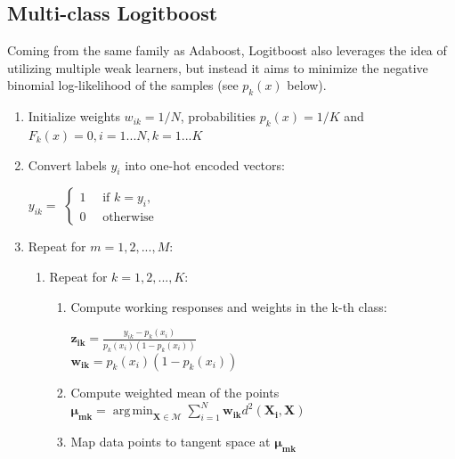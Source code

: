 \documentclass[12pt]{article}
\DeclareMathOperator*{\argmin}{arg\,min}
\begin{document}
\begin{sloppypar}
\subsection{Multi-class Logitboost}
Coming from the same family as Adaboost, Logitboost also leverages the idea of utilizing multiple weak learners, but instead it aims to minimize the negative binomial log-likelihood of the samples (see $p_{k}(x)$ below). \\

\begin{algorithm}[H]
    \begin{enumerate}
    \item Initialize weights $w_{ik} = 1/N$, probabilities $p_{k}(x) = 1/K$ and $F_{k}(x) = 0, i = 1...N, k = 1...K$\\
    \item Convert labels $y_{i}$ into one-hot encoded vectors:
        \begin{center}
            $y_{ik} = $
            $\begin{cases}
                1 \quad \text{ if } k = y_{i}, \\
                0 \quad \text{ otherwise}
            \end{cases}$
        \end{center}
    \item Repeat for $m = 1, 2, ..., M$:
        \begin{enumerate}
            \item Repeat for $k = 1, 2, ..., K$:
                \begin{enumerate}
                    \item Compute working responses and weights in the k-th class: \\
                    \begin{center}
                        $\bm{z_{ik}} = \frac{y_{ik} - p_{k}(x_{i})}{p_{k}(x_{i})(1 - p_{k}(x_{i}))}$ \\
                        $\bm{w_{ik}} = p_{k}(x_{i})(1 - p_{k}(x_{i}))$ \\
                    \end{center}
                    \item Compute weighted mean of the points $\bm{\mu_{mk}} = \argmin_{\bm{X} \in \mathcal{M}} \sum_{i=1}^{N} \bm{w_{ik}}d^{2}(\bm{X_{i}}, \bm{X}) $\\
                    \item Map data points to tangent space at $\bm{\mu_{mk}}$\\

\end{enumerate}
\end{enumerate}
\end{enumerate}
\end{algorithm}
\end{sloppypar}
\end{document}
